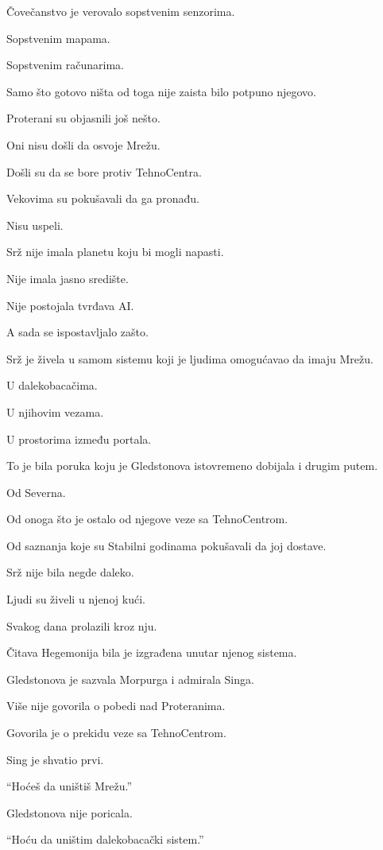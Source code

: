 Čovečanstvo je verovalo sopstvenim senzorima.

Sopstvenim mapama.

Sopstvenim računarima.

Samo što gotovo ništa od toga nije zaista bilo potpuno njegovo.

\bigskip

Proterani su objasnili još nešto.

Oni nisu došli da osvoje Mrežu.

Došli su da se bore protiv TehnoCentra.

Vekovima su pokušavali da ga pronađu.

Nisu uspeli.

Srž nije imala planetu koju bi mogli napasti.

Nije imala jasno središte.

Nije postojala tvrđava AI.

A sada se ispostavljalo zašto.

Srž je živela u samom sistemu koji je ljudima omogućavao da imaju Mrežu.

U dalekobacačima.

U njihovim vezama.

U prostorima između portala.

\bigskip

To je bila poruka koju je Gledstonova istovremeno dobijala i drugim putem.

Od Severna.

Od onoga što je ostalo od njegove veze sa TehnoCentrom.

Od saznanja koje su Stabilni godinama pokušavali da joj dostave.

Srž nije bila negde daleko.

Ljudi su živeli u njenoj kući.

Svakog dana prolazili kroz nju.

Čitava Hegemonija bila je izgrađena unutar njenog sistema.

\bigskip

Gledstonova je sazvala Morpurga i admirala Singa.

Više nije govorila o pobedi nad Proteranima.

Govorila je o prekidu veze sa TehnoCentrom.

Sing je shvatio prvi.

``Hoćeš da uništiš Mrežu.''

Gledstonova nije poricala.

``Hoću da uništim dalekobacački sistem.''

